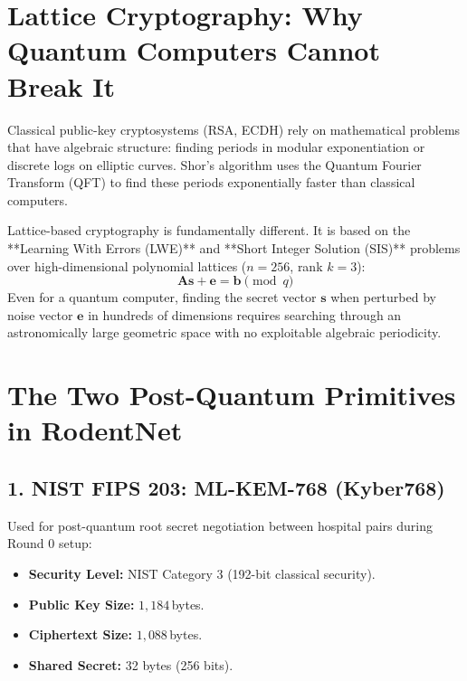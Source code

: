 \documentclass[11pt,a4paper]{report}
\begin{document}
\section{Lattice Cryptography: Why Quantum Computers Cannot Break It}
Classical public-key cryptosystems (RSA, ECDH) rely on mathematical problems that have algebraic structure: finding periods in modular exponentiation or discrete logs on elliptic curves. Shor's algorithm uses the Quantum Fourier Transform (QFT) to find these periods exponentially faster than classical computers.

Lattice-based cryptography is fundamentally different. It is based on the **Learning With Errors (LWE)** and **Short Integer Solution (SIS)** problems over high-dimensional polynomial lattices ($n=256$, rank $k=3$):
\begin{equation}
\mathbf{A} \mathbf{s} + \mathbf{e} = \mathbf{b} \pmod q
\end{equation}
Even for a quantum computer, finding the secret vector $\mathbf{s}$ when perturbed by noise vector $\mathbf{e}$ in hundreds of dimensions requires searching through an astronomically large geometric space with no exploitable algebraic periodicity.

\section{The Two Post-Quantum Primitives in RodentNet}

\subsection{1. NIST FIPS 203: ML-KEM-768 (Kyber768)}
Used for post-quantum root secret negotiation between hospital pairs during Round 0 setup:
\begin{itemize}[itemsep=1pt]
  \item \textbf{Security Level:} NIST Category 3 (192-bit classical security).
  \item \textbf{Public Key Size:} $1{,}184$\,bytes.
  \item \textbf{Ciphertext Size:} $1{,}088$\,bytes.
  \item \textbf{Shared Secret:} 32 bytes (256 bits).
\end{itemize}
\end{document}
